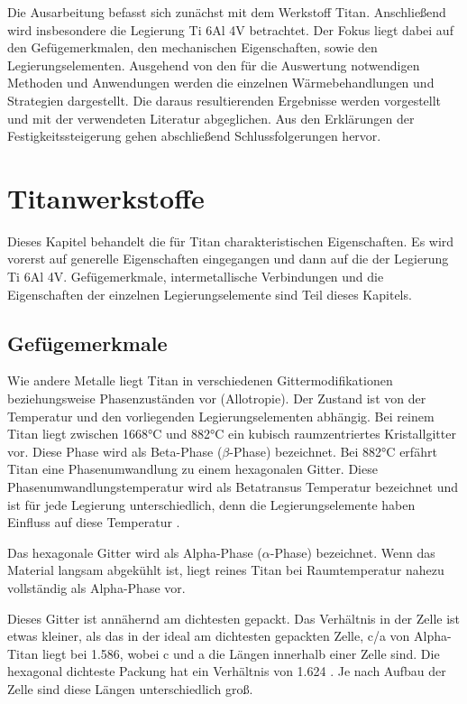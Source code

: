 \documentclass[a4paper, 11pt]{tubsreprt}
\begin{document}
Die Ausarbeitung befasst sich zunächst mit dem Werkstoff Titan. Anschließend wird insbesondere die Legierung Ti 6Al 4V betrachtet. Der Fokus liegt dabei auf den Gefügemerkmalen, den mechanischen Eigenschaften, sowie den Legierungselementen. Ausgehend von den für die Auswertung notwendigen Methoden und Anwendungen werden die einzelnen Wärmebehandlungen und Strategien dargestellt. Die daraus resultierenden Ergebnisse werden vorgestellt und mit der verwendeten Literatur abgeglichen. Aus den Erklärungen der Festigkeitssteigerung gehen abschließend Schlussfolgerungen hervor.

\chapter{Titanwerkstoffe}
Dieses Kapitel behandelt die für Titan charakteristischen Eigenschaften. Es wird vorerst auf generelle Eigenschaften eingegangen und dann auf die der Legierung Ti 6Al 4V. Gefügemerkmale, intermetallische Verbindungen und die Eigenschaften der einzelnen Legierungselemente sind Teil dieses Kapitels.
\section{Gefügemerkmale}\label{Abschnitt Gefügemerkmale}
Wie andere Metalle liegt Titan in verschiedenen Gittermodifikationen beziehungsweise Phasenzuständen vor (Allotropie). Der Zustand ist von der Temperatur und den vorliegenden Legierungselementen abhängig. Bei reinem Titan liegt zwischen 1668°C und 882°C ein kubisch raumzentriertes Kristallgitter vor. Diese Phase wird als Beta-Phase ($\beta$-Phase) bezeichnet. Bei 882°C erfährt Titan eine Phasenumwandlung zu einem hexagonalen Gitter. Diese Phasenumwandlungstemperatur wird als Betatransus Temperatur bezeichnet und ist für jede Legierung unterschiedlich, denn die Legierungselemente haben Einfluss auf diese Temperatur \cite{Luetjering2007}.

Das hexagonale Gitter wird als Alpha-Phase ($\alpha$-Phase) bezeichnet. Wenn das Material langsam abgekühlt ist, liegt reines Titan bei Raumtemperatur nahezu vollständig als Alpha-Phase vor. 

Dieses Gitter ist annähernd am dichtesten gepackt. Das Verhältnis in der Zelle ist etwas kleiner, als das in der ideal am dichtesten gepackten Zelle, c/a von Alpha-Titan liegt bei 1.586, wobei c und a die Längen innerhalb einer Zelle sind. Die hexagonal dichteste Packung hat ein Verhältnis von 1.624 \cite{Luetjering2007}. Je nach Aufbau der Zelle sind diese Längen unterschiedlich groß.
\end{document}
